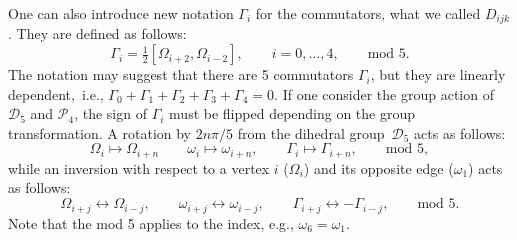 \documentclass[10pt,a4paper]{amsart}
\numberwithin{equation}{section}
\begin{document}
One can also introduce new notation $\Gamma_i$ for the commutators, what we called $D_{ijk}$. They are defined as follows:
\[
\Gamma_i=\tfrac{1}{2}[\Omega_{i+2},\Omega_{i-2}],\qquad i=0,\dots,4,\qquad\mbox{mod }5.
\]
The notation may suggest that there are 5 commutators $\Gamma_i$, but they are linearly dependent,~i.e.,
$
\Gamma_0+\Gamma_1+\Gamma_2+\Gamma_3+\Gamma_4=0$.
If one consider the group action of $\mathcal{D}_5$ and $\mathcal{P}_4$, the sign of $\Gamma_i$ must be flipped depending on the group transformation. A rotation by $2n\pi/5$ from the dihedral group~$\mathcal{D}_5$ acts as follows:
\[
 \Omega_i\mapsto \Omega_{i+n}\qquad\omega_i\mapsto\omega_{i+n},\qquad \Gamma_i\mapsto \Gamma_{i+n},\qquad\mbox{mod }5,
\]
while an inversion with respect to a vertex $i$ ($\Omega_i$) and its opposite edge ($\omega_1$) acts as follows:
\[
\Omega_{i+j}\longleftrightarrow\Omega_{i-j},\qquad\omega_{i+j}\longleftrightarrow\omega_{i-j},\qquad\Gamma_{i+j}\longleftrightarrow -\Gamma_{i-j},\qquad\mbox{mod }5.
\]
Note that the mod 5 applies to the index, e.g., $\omega_6=\omega_1$.
\end{document}
